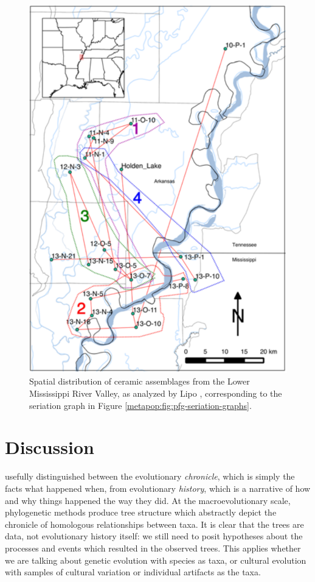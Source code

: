     \begin{figure}[ht]
    \centering
    \includegraphics[scale=0.5]{graphics/multipleseriation/pfg-spatial.pdf}
    \caption{Spatial distribution of ceramic assemblages from 
    the Lower Mississippi River Valley, as analyzed by Lipo \citeyearpar{Lipo2001a}, corresponding to the seriation graph in Figure \ref{metapop:fig:pfg-seriation-graphs}.}
    \label{metapop:fig:pfg-spatial-groupings}
    \end{figure}
    
    
    \section{Discussion}\label{metapop:sec:discussion}
    
    \citet{OHara1988} usefully distinguished between the evolutionary \emph{chronicle}, which is simply the facts what happened when, from evolutionary \emph{history}, which is a narrative of how and why things happened the way they did.  At the macroevolutionary scale, phylogenetic methods produce tree structure which abstractly depict the chronicle of homologous relationships between taxa.  It is clear that the trees are data, not evolutionary history itself:  we still need to posit hypotheses about the processes and events which resulted in the observed trees.  This applies whether we are talking about genetic evolution with species as taxa, or cultural evolution with samples of cultural variation or individual artifacts as the taxa.  
    
